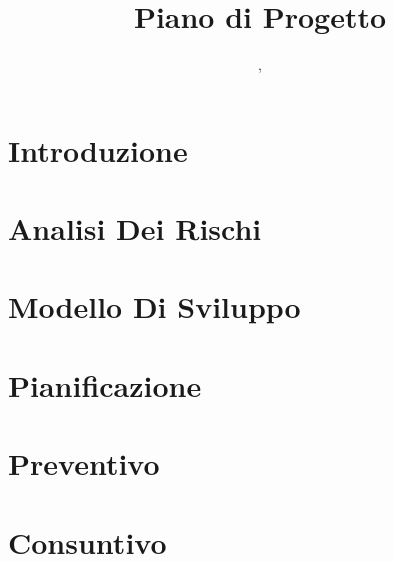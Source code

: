 \documentclass{classes/base}
\title{Piano di Progetto}
\author{\angela, \\ \marcob}
\begin{document}
	\maketitle
	\newpage
	
	\newpage
	\tableofcontents
	\newpage
	\listoftables
	\newpage
	\listoffigures
	\newpage

	\section{Introduzione}
	
	
    \newpage
	\section{Analisi Dei Rischi}
	
	\newpage

	\section{Modello Di Sviluppo}
	

	\newpage
	\section{Pianificazione}
	

	\newpage
	\section{Preventivo}
	

	\newpage
	\section{Consuntivo}
	
	
\end{document}
